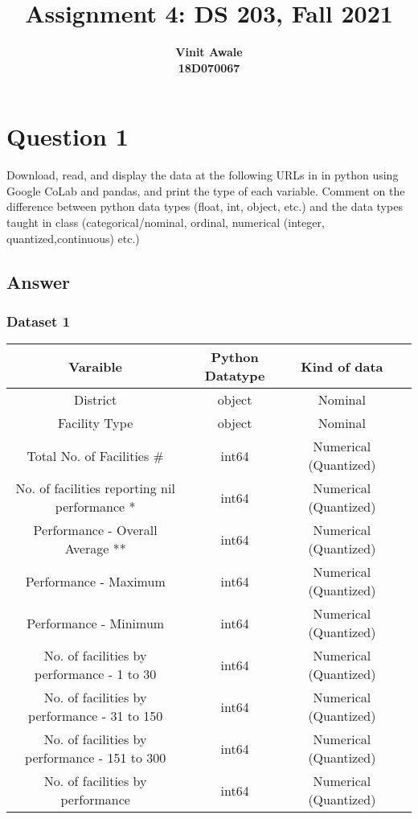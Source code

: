 \documentclass[12pt]{article}
\title{Assignment 4: DS 203, Fall 2021}
\author{\textbf{Vinit Awale} \\
        \textbf{18D070067}}
\date{}
\begin{document}
\maketitle

\section*{Question 1}
Download, read, and display the data at the following URLs in in python using Google CoLab and pandas, and print the type of each variable. Comment on the difference between python data types (float, int, object, etc.) and the data types taught in class (categorical/nominal, ordinal, numerical (integer, quantized,continuous) etc.)
\subsection*{Answer}
\subsubsection*{Dataset 1}
\begin{center}
    \begin{tabular}{ |c|c|c|c| } 
    \hline
    Varaible & Python Datatype & Kind of data \\
    \hline
    District                                        & object & Nominal\\
    Facility Type                                   & object & Nominal\\
    Total No. of Facilities #                       & int64  & Numerical (Quantized) \\
    No. of facilities reporting nil performance *   & int64  & Numerical (Quantized) \\
    Performance - Overall Average **                & int64  & Numerical (Quantized) \\
    Performance - Maximum                           &  int64 & Numerical (Quantized) \\
    Performance - Minimum                           &  int64 & Numerical (Quantized) \\
    No. of facilities by performance - 1 to 30      &  int64 & Numerical (Quantized) \\
    No. of facilities by performance - 31 to 150    &  int64 & Numerical (Quantized) \\
    No. of facilities by performance - 151 to 300   &  int64 & Numerical (Quantized)\\
    No. of facilities by performance \geq 300       &  int64 & Numerical (Quantized) \\
    \hline
    \end{tabular}
\end{center}
\end{document}
